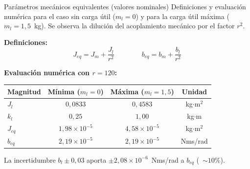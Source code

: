 \documentclass[aspectratio=169,t]{beamer}
\begin{document}
\begin{frame}{Parámetros mecánicos equivalentes (valores nominales)}
{\small\color{uncGray}Definiciones y evaluación numérica para el caso sin carga útil ($m_l=0$) y para la carga útil máxima ($m_l=1{,}5$~kg). Se observa la dilución del acoplamiento mecánico por el factor $r^2$.}\par
\vspace{3mm}

\textbf{Definiciones:}
\begin{equation*}
J_{eq} = J_m + \frac{J_l}{r^2}
\qquad\qquad
b_{eq} = b_m + \frac{b_l}{r^2}
\end{equation*}

\vspace{4mm}
\textbf{Evaluación numérica con $r=120$:}\par
\vspace{2mm}
\centering
\renewcommand{\arraystretch}{1.25}
\begin{tabular}{|l|c|c|c|}
\hline
\textbf{Magnitud} & \textbf{Mínima ($m_l=0$)} & \textbf{Máxima ($m_l=1{,}5$)} & \textbf{Unidad} \\
\hline
$J_l$    & $0{,}0833$              & $0{,}4583$              & kg$\cdot$m$^2$ \\
$k_l$    & $0{,}25$                & $1{,}00$                & kg$\cdot$m \\
$J_{eq}$ & $1{,}98\times 10^{-5}$  & $4{,}58\times 10^{-5}$  & kg$\cdot$m$^2$ \\
$b_{eq}$ & $2{,}19\times 10^{-5}$  & $2{,}19\times 10^{-5}$  & Nms/rad \\
\hline
\end{tabular}

\vspace{3mm}
{\small La incertidumbre $b_l\pm 0{,}03$ aporta $\pm 2{,}08{\times}10^{-6}$~Nms/rad a $b_{eq}$ (~$\sim 10\%$).}
\end{frame}
\end{document}
